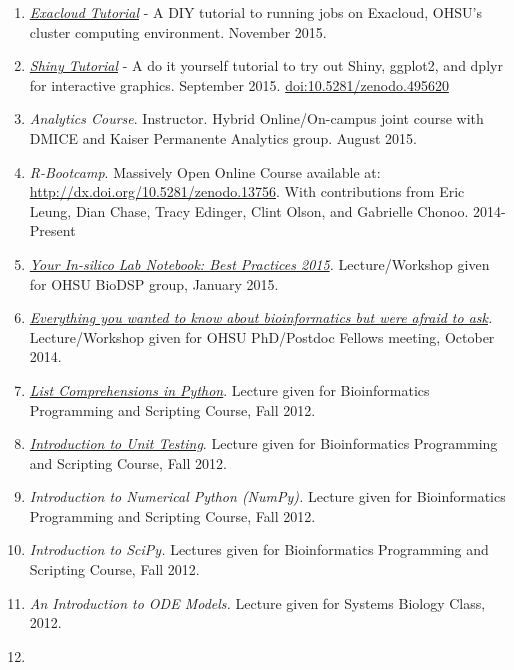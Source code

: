 \documentclass[11pt,]{article}
\begin{document}
\begin{enumerate}
\item
  \href{https://www.dropbox.com/s/chg6ciknxonp5el/exacloud-tutorial.pdf}{\emph{Exacloud
  Tutorial}} - A DIY tutorial to running jobs on Exacloud, OHSU's
  cluster computing environment. November 2015.
\item
  \href{https://www.dropbox.com/s/5ceg6wdrustjoae/tutorialApp.zip}{\emph{Shiny
  Tutorial}} - A do it yourself tutorial to try out Shiny, ggplot2, and
  dplyr for interactive graphics. September 2015.
  \href{https://doi.org/10.5281/zenodo.495620}{doi:10.5281/zenodo.495620}
\item
  \emph{Analytics Course}. Instructor. Hybrid Online/On-campus joint
  course with DMICE and Kaiser Permanente Analytics group. August 2015.
\item
  \emph{R-Bootcamp}. Massively Open Online Course available at:
  \url{http://dx.doi.org/10.5281/zenodo.13756}. With contributions from
  Eric Leung, Dian Chase, Tracy Edinger, Clint Olson, and Gabrielle
  Chonoo. 2014-Present
\item
  \href{https://www.dropbox.com/s/ddyq88gqh8priv8/insilicotalk-2015.pptx?dl=0}{\emph{Your
  In-silico Lab Notebook: Best Practices 2015}}\emph{.} Lecture/Workshop
  given for OHSU BioDSP group, January 2015.
\item
  \href{https://www.dropbox.com/s/a4qgwap4jehzs8x/everything-you-wanted-to-know.pptx?dl=0}{\emph{Everything
  you wanted to know about bioinformatics but were afraid to
  ask}}\emph{.} Lecture/Workshop given for OHSU PhD/Postdoc Fellows
  meeting, October 2014.
\item
  \href{https://www.dropbox.com/s/1my6l8diprnzg4n/lecture_slides_day7_2012-laderas.pptx?dl=0}{\emph{List
  Comprehensions in Python}}. Lecture given for Bioinformatics
  Programming and Scripting Course, Fall 2012.
\item
  \href{https://www.dropbox.com/s/jdgbb07xydmxah5/lecture_slides_day10_1027-laderas.pdf?dl=0}{\emph{Introduction
  to Unit Testing}}. Lecture given for Bioinformatics Programming and
  Scripting Course, Fall 2012.
\item
  \emph{Introduction to Numerical Python (NumPy).} Lecture given for
  Bioinformatics Programming and Scripting Course, Fall 2012.
\item
  \emph{Introduction to SciPy.} Lectures given for Bioinformatics
  Programming and Scripting Course, Fall 2012.
\item
  \emph{An Introduction to ODE Models.} Lecture given for Systems
  Biology Class, 2012.
\item

\end{enumerate}
\end{document}
